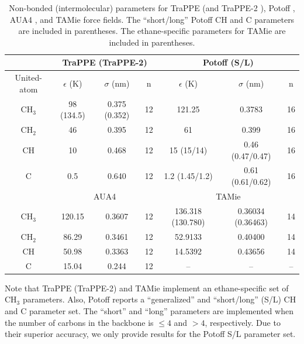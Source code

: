 \documentclass[preprint,review,12pt]{elsarticle}
\begin{document}
	\begin{table}[h!]
		\caption{Non-bonded (intermolecular) parameters for TraPPE \cite{TraPPE,Martin1999} (and TraPPE-2 \cite{TraPPEUA2}), Potoff \cite{Mie,Potoff_branched}, AUA4 \cite{AUA4,Nieto2008}, and TAMie \cite{TAMie,Weidler2016} force fields. The ``short/long'' Potoff CH and C parameters are included in parentheses. The ethane-specific parameters for TAMie are included in parentheses.} \label{tab:nonbonded params}
		\begin{center}
			\begin{tabular}{|c|c|c|c|c|c|c|}
				\hline
				\multicolumn{1}{|c}{} & \multicolumn{3}{|c}{TraPPE  (TraPPE-2)} & \multicolumn{3}{|c|}{Potoff (S/L)}  \\ \hline
				United-atom & $\epsilon$ (K) & $\sigma$ (nm) & n & $\epsilon$ (K) & $\sigma$ (nm) & n \\ \hline
				CH$_3$ & 98 (134.5)  & 0.375 (0.352) & 12 & 121.25 & 0.3783 & 16  \\ 
				CH$_2$ & 46 & 0.395 & 12 & 61 & 0.399 & 16 \\ 
				CH & 10 & 0.468 & 12 & 15 (15/14) & 0.46 (0.47/0.47) & 16\\
				C & 0.5 & 0.640 & 12 & 1.2 (1.45/1.2) & 0.61 (0.61/0.62) & 16\\
				\hline
				\multicolumn{1}{|c}{} & \multicolumn{3}{|c}{AUA4} & \multicolumn{3}{|c|}{TAMie} \\ \hline
				CH$_3$ & 120.15  & 0.3607 & 12 & 136.318 (130.780) & 0.36034 (0.36463) & 14 \\ 
				CH$_2$ & 86.29 & 0.3461 & 12 & 52.9133 & 0.40400 & 14 \\ 
				CH & 50.98 & 0.3363 & 12 & 14.5392 & 0.43656 & 14\\
				C & 15.04 & 0.244 & 12 & -- & -- & --\\
				\hline
			\end{tabular}
		\end{center} 
	\end{table}

    Note that TraPPE (TraPPE-2) and TAMie implement an ethane-specific set of CH$_3$ parameters. Also, Potoff reports a ``generalized'' and ``short/long'' (S/L) CH and C parameter set. The ``short'' and ``long'' parameters are implemented when the number of carbons in the backbone is $\le 4$ and $> 4$, respectively. Due to their superior accuracy, we only provide results for the Potoff S/L parameter set.
    
	
\end{document}
